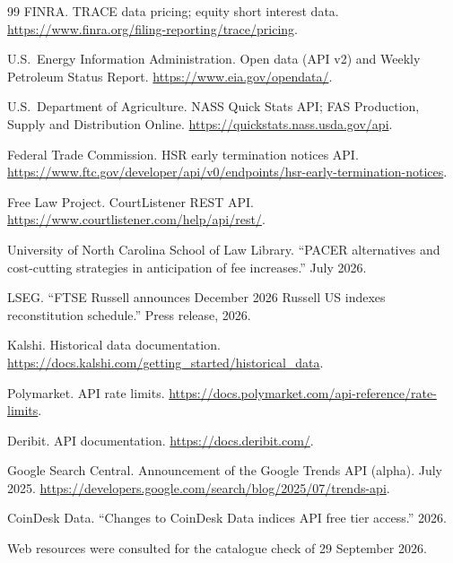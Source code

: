 \documentclass[10pt, a4paper, twocolumn]{article}
\begin{document}
\begin{thebibliography}{99}
FINRA.
\newblock TRACE data pricing; equity short interest data.
\newblock \url{https://www.finra.org/filing-reporting/trace/pricing}.

U.S.\ Energy Information Administration.
\newblock Open data (API v2) and Weekly Petroleum Status Report.
\newblock \url{https://www.eia.gov/opendata/}.

U.S.\ Department of Agriculture.
\newblock NASS Quick Stats API; FAS Production, Supply and Distribution Online.
\newblock \url{https://quickstats.nass.usda.gov/api}.

Federal Trade Commission.
\newblock HSR early termination notices API.
\newblock \url{https://www.ftc.gov/developer/api/v0/endpoints/hsr-early-termination-notices}.

Free Law Project.
\newblock CourtListener REST API.
\newblock \url{https://www.courtlistener.com/help/api/rest/}.

University of North Carolina School of Law Library.
\newblock ``PACER alternatives and cost-cutting strategies in anticipation of fee increases.'' July 2026.

LSEG.
\newblock ``FTSE Russell announces December 2026 Russell US indexes reconstitution schedule.'' Press release, 2026.

Kalshi.
\newblock Historical data documentation.
\newblock \url{https://docs.kalshi.com/getting_started/historical_data}.

Polymarket.
\newblock API rate limits.
\newblock \url{https://docs.polymarket.com/api-reference/rate-limits}.

Deribit.
\newblock API documentation.
\newblock \url{https://docs.deribit.com/}.

Google Search Central.
\newblock Announcement of the Google Trends API (alpha). July 2025.
\newblock \url{https://developers.google.com/search/blog/2025/07/trends-api}.

CoinDesk Data.
\newblock ``Changes to CoinDesk Data indices API free tier access.'' 2026.

\end{thebibliography}

{\footnotesize\noindent Web resources were consulted for the catalogue check of 29 September 2026.\par}

\onecolumn
\appendix
\renewcommand{\thetable}{A\arabic{table}}
\renewcommand{\theHtable}{A\arabic{table}}
\setcounter{table}{0}
\end{document}
